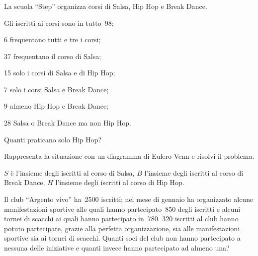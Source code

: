 \subsubsection*{}

\begin{esercizio}
\label{ese:7.25}
La scuola ``Step'' organizza corsi di Salsa, Hip Hop e Break Dance.

\begin{multicols}{2}
\begin{enumeratea}
\item Gli iscritti ai corsi sono in tutto~98;
\item 6 frequentano tutti e tre i corsi;
\item 37 frequentano il corso di Salsa;
\item 15 solo i corsi di Salsa e di Hip Hop;
\item 7 solo i corsi Salsa e Break Dance;
\item 9 almeno Hip Hop e Break Dance;
\item 28 Salsa o Break Dance ma non Hip Hop.
\end{enumeratea}
\end{multicols}

Quanti praticano solo Hip Hop?

Rappresenta la situazione con un diagramma di Eulero-Venn e risolvi il 
problema.
%  

\(S\) è l'insieme degli iscritti al corso di Salsa, \(B\) l'insieme degli iscritti 
al corso di
Break Dance, \(H\) l'insieme degli iscritti al corso di Hip Hop.
\end{esercizio}

\begin{esercizio}
\label{ese:7.26}
Il club ``Argento vivo'' ha~2500 iscritti; nel mese di gennaio ha organizzato 
alcune
manifestazioni sportive alle quali hanno partecipato~850 degli iscritti
e alcuni tornei di scacchi ai quali hanno partecipato in~780. 320
iscritti al club hanno potuto partecipare, grazie alla perfetta
organizzazione, sia alle manifestazioni sportive sia ai tornei di
scacchi. Quanti soci del club non hanno partecipato a nessuna delle
iniziative e quanti invece hanno partecipato ad almeno una?
\end{esercizio}

